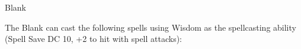 \begin{DndMonster}[width=0.5\textwidth]{Blank\label{monster:Blank}}
	\begin{DndMonsterSpells}
		\item[Spellcasting] The Blank can cast the following spells using Wisdom as the spellcasting ability (Spell Save DC 10, +2 to hit with spell attacks):
	\end{DndMonsterSpells}
	
	
	\DndMonsterReaction[%
		name		= {Reaction},	%
		trigger		= {Trigger},	%
		response	= {Response}	%
	]%
\end{DndMonster}